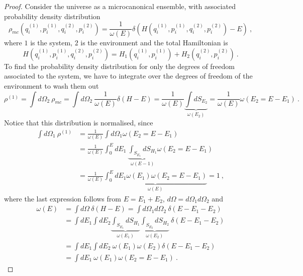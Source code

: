     \begin{proof}
        Consider the universe as a microcanonical ensemble, with associated probability density distribution 
        \begin{equation*}
            \rho_{mc} (q_i^{(1)}, p_i^{(1)}, q_i^{(2)}, p_i^{(2)}) = \frac{1}{\omega(E)} \delta (H (q_i^{(1)}, p_i^{(1)}, q_i^{(2)}, p_i^{(2)}) - E) ~,
        \end{equation*}
        where $1$ is the system, $2$ is the environment and the total Hamiltonian is 
        \begin{equation*}
            H (q_i^{(1)}, p_i^{(1)}, q_i^{(2)}, p_i^{(2)}) = H_1 (q_i^{(1)}, p_i^{(1)}) + H_2 (q_i^{(2)}, p_i^{(2)}) ~.
        \end{equation*}
        To find the probability density distribution for only the degrees of freedom associated to the system, we have to integrate over the degrees of freedom of the environment to wash them out
        \begin{equation*}
            \rho^{(1)} = \int d\Omega_2 ~ \rho_{mc} = \int d\Omega_2 ~ \frac{1}{\omega(E)} \delta(H - E) = \frac{1}{\omega(E)} \underbrace{\int dS_{E_2}}_{\omega(E_2)} = \frac{1}{\omega(E)} \omega(E_2 = E - E_1) ~.
        \end{equation*}
        Notice that this distribution is normalised, since 
        \begin{equation*}
        \begin{aligned}
            \int d\Omega_1 ~ \rho^{(1)} & = \frac{1}{\omega(E)} \int d\Omega_1 \omega(E_2 = E - E_1) \\ & = \frac{1}{\omega(E)} \int_0^E dE_1 ~ \underbrace{\int_{S_{E_1}} dS_{H_1}}_{\omega(E-1)} \omega(E_2 = E - E_1) \\ & = \frac{1}{\omega(E)} \underbrace{\int_0^E dE_1 \omega(E_1) \omega(E_2 = E - E_1) }_{\omega(E)} = 1 ~,
        \end{aligned}
        \end{equation*}
        where the last expression follows from $E = E_1 + E_2$, $d\Omega = d\Omega_1 d\Omega_2$ and 
        \begin{equation*}
        \begin{aligned}
            \omega(E) & = \int d\Omega ~ \delta(H - E) = \int d\Omega_1 d\Omega_2 ~ \delta(E - E_1 - E_2) \\ & = \int dE_1 \int dE_2 \underbrace{\int_{S_{E_1}} dS_{H_1}}_{\omega(E_1)} \underbrace{\int_{S_{E_2}} dS_{H_2}}_{\omega(E_2)} ~ \delta(E - E_1 - E_2) \\ & = \int dE_1 \int dE_2 ~\omega(E_1) \omega(E_2) \delta(E - E_1 - E_2)\\ &  = \int dE_1 ~ \omega(E_1) \omega(E_2 = E - E_1) ~.

\end{aligned}
\end{equation*}
\end{proof}

